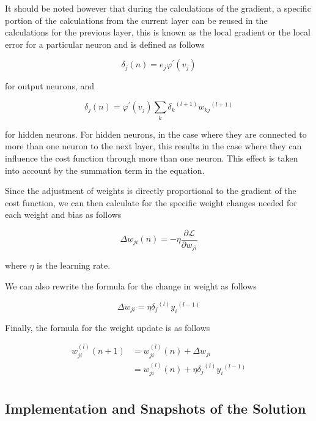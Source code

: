 \documentclass{article} %
\theoremstyle{definition}
\theoremstyle{remark}
\theoremstyle{plain}
\begin{document}
It should be noted however that during the calculations of the gradient, a specific portion of the calculations from the current layer can be reused in the calculations for the previous layer, this is known as the local gradient or the local error for a particular neuron and is defined as follows

\begin{equation}\label{local_error_output}
	\delta_j(n)=e_j \varphi^{\prime}\left(v_j\right)
\end{equation}

for output neurons, and


\begin{equation}\label{local_error_hidden}
	\delta_j(n)= \varphi^{\prime} (v_j) \sum_k {\delta_k}^{(l+1)} {w_{kj}}^{(l+1)}
\end{equation}

for hidden neurons. For hidden neurons, in the case where they are connected to more than one neuron to the next layer, this results in the case where they can influence the cost function through more than one neuron. This effect is taken into account by the summation term in the equation.


Since the adjustment of weights is directly proportional to the gradient of the cost function, we can then calculate for the specific weight changes needed for each weight and bias as follows


\begin{equation}\label{weight_update}
	\Delta {w}_{ji}(n) = -\eta \frac{\partial \mathcal{L}}{\partial w_{ji}}
\end{equation}

where $\eta$ is the learning rate. 

We can also rewrite the formula for the change in weight as follows


\begin{equation}\label{final_weight_update}
	\Delta {w}_{ji} = \eta {\delta_j}^{(l)} {y_i}^{(l-1)}
\end{equation}

Finally, the formula for the weight update is as follows

\begin{align*}
    {w_{ji}^{(l)} (n+1)} & =  {w_{ji}^{(l)} (n)} + \Delta {w}_{ji} \\
    & = {w_{ji}^{(l)} (n)} + \eta {\delta_j}^{(l)} {y_i}^{(l-1)} \\
\end{align*}

\subsection{Implementation and Snapshots of the Solution}
\end{document}
